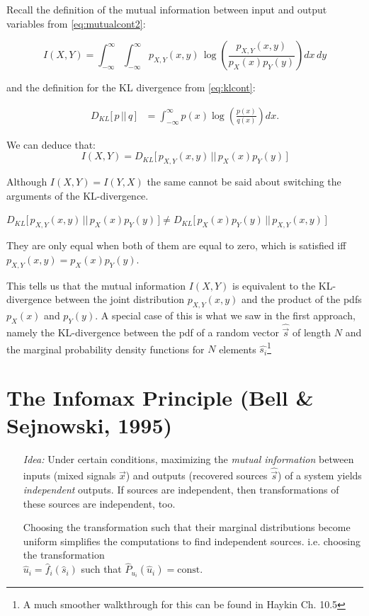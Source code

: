 Recall the definition of the mutual information between input and output variables from \eqref{eq:mutualcont2}:

\begin{equation*}
I(X,Y) = \int_{-\infty}^{\infty} \int_{-\infty}^{\infty} p_{X,Y}(x,y) \, \log \left(\frac{p_{X,Y}(x,y)}{p_X(x) p_Y(y)}\right) dx \, dy
\end{equation*}

and the definition for the KL divergence from \eqref{eq:klcont}:

\begin{align*}
D_{KL}\lbrack\,p\, ||\, q\,\rbrack 
&= \int_{-\infty}^{\infty} p(x) \log \left( \frac{p(x)}{q(x)} \right) dx.
\end{align*}

We can deduce that:
$$
I(X,Y) = D_{KL} \lbrack \, p_{X,Y}(x,y) \, || \, p_X(x) p_Y(y) \, \rbrack
$$

Although $I(X,Y) = I(Y,X)$ the same cannot be said about switching the arguments of the KL-divergence.

$
D_{KL} \lbrack \, p_{X,Y}(x,y) \, || \, p_X(x) p_Y(y) \, \rbrack \ne 
D_{KL} \lbrack \, p_X(x) p_Y(y) \, || \, p_{X,Y}(x,y)\, \rbrack
$

They are only equal when both of them are equal to zero, which is satisfied iff $p_{X,Y}(x,y) = p_X(x) p_Y(y)$.

This tells us that the mutual information $I(X,Y)$ is equivalent to the KL-divergence between the joint distribution $p_{X,Y}(x,y)$ and 
the product of the pdfs $p_X(x)$ and $p_Y(y)$. A special case of this is what we saw in the first approach, namely the KL-divergence 
between the pdf of a random vector $\widehat {\vec s}$ of length $N$ and the marginal probability density functions for $N$ elements 
$\widehat{s_i}$\footnote{A much smoother walkthrough for this can be found in 
Haykin Ch. 10.5}

\clearpage

\section{The Infomax Principle (Bell \& Sejnowski, 1995)}

\begin{itemize}
\item[\emph{Idea:}] Under certain conditions, maximizing the
  \emph{mutual information} between inputs (mixed signals $\vec x$) and outputs
  (recovered sources $\widehat{\vec s}$) of a system yields \emph{independent} outputs. 
  If sources are independent, then
  transformations of these sources are independent, too.
  
  Choosing the transformation such that their marginal distributions become uniform 
  simplifies the computations to find independent sources. i.e. choosing the transformation \\
$\widehat{u}_i = \widehat{f}_i(\widehat{s}_i)$ such that
$\widehat{P}_{u_i}(\widehat{u}_i) = \mathrm{const.}$

\end{itemize}

